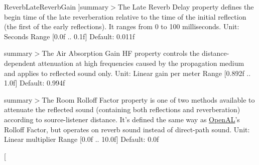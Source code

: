 \begin{Desc}
\begin{description}
{\hypertarget{namespace_open_t_k_1_1_audio_1_1_open_a_l_aa0356299908369b4365d28572c0ec20bae05dbd4b077c31eb12b614cdca1e2df1}{Reverb\-Late\-Reverb\-Gain}\label{namespace_open_t_k_1_1_audio_1_1_open_a_l_aa0356299908369b4365d28572c0ec20bae05dbd4b077c31eb12b614cdca1e2df1}
}]summary$>$The Late Reverb Delay property defines the begin time of the late reverberation relative to the time of the initial reflection (the first of the early reflections). It ranges from 0 to 100 milliseconds. Unit\-: Seconds Range \mbox{[}0.\-0f .. 0.\-1f\mbox{]} Default\-: 0.\-011f\item[{\em 
\hypertarget{namespace_open_t_k_1_1_audio_1_1_open_a_l_aa0356299908369b4365d28572c0ec20ba5fb80d4fe6f5b590e09cc4268ff6ace8}{Reverb\-Late\-Reverb\-Delay}\label{namespace_open_t_k_1_1_audio_1_1_open_a_l_aa0356299908369b4365d28572c0ec20ba5fb80d4fe6f5b590e09cc4268ff6ace8}
}]summary$>$The Air Absorption Gain H\-F property controls the distance-\/dependent attenuation at high frequencies caused by the propagation medium and applies to reflected sound only. Unit\-: Linear gain per meter Range \mbox{[}0.\-892f .. 1.\-0f\mbox{]} Default\-: 0.\-994f\item[{\em 
\hypertarget{namespace_open_t_k_1_1_audio_1_1_open_a_l_aa0356299908369b4365d28572c0ec20baabfc027c9907cd3f9337519fe1b39fe6}{Reverb\-Air\-Absorption\-Gain\-H\-F}\label{namespace_open_t_k_1_1_audio_1_1_open_a_l_aa0356299908369b4365d28572c0ec20baabfc027c9907cd3f9337519fe1b39fe6}
}]summary$>$The Room Rolloff Factor property is one of two methods available to attenuate the reflected sound (containing both reflections and reverberation) according to source-\/listener distance. It's defined the same way as \hyperlink{namespace_open_t_k_1_1_audio_1_1_open_a_l}{Open\-A\-L}'s Rolloff Factor, but operates on reverb sound instead of direct-\/path sound. Unit\-: Linear multiplier Range \mbox{[}0.\-0f .. 10.\-0f\mbox{]} Default\-: 0.\-0f\item[{\em 
}
\end{description}
\end{Desc}
